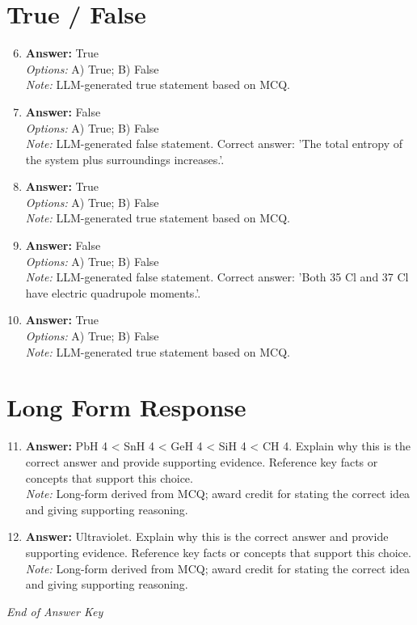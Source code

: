 \documentclass[12pt]{article}
\begin{document}
\section*{True / False}
\begin{enumerate}[label=\arabic*.]
\setcounter{enumi}{5}
\item \textbf{Answer:} True
\\ \textit{Options:} A) True; B) False
\\ \textit{Note:} LLM-generated true statement based on MCQ.
\item \textbf{Answer:} False
\\ \textit{Options:} A) True; B) False
\\ \textit{Note:} LLM-generated false statement. Correct answer: 'The total entropy of the system plus surroundings increases.'.
\item \textbf{Answer:} True
\\ \textit{Options:} A) True; B) False
\\ \textit{Note:} LLM-generated true statement based on MCQ.
\item \textbf{Answer:} False
\\ \textit{Options:} A) True; B) False
\\ \textit{Note:} LLM-generated false statement. Correct answer: 'Both 35 Cl and 37 Cl have electric quadrupole moments.'.
\item \textbf{Answer:} True
\\ \textit{Options:} A) True; B) False
\\ \textit{Note:} LLM-generated true statement based on MCQ.
\end{enumerate}

\section*{Long Form Response}
\begin{enumerate}[label=\arabic*.]
\setcounter{enumi}{10}
\item \textbf{Answer:} PbH 4 \textless{} SnH 4 \textless{} GeH 4 \textless{} SiH 4 \textless{} CH 4. Explain why this is the correct answer and provide supporting evidence. Reference key facts or concepts that support this choice.
\\ \textit{Note:} Long-form derived from MCQ; award credit for stating the correct idea and giving supporting reasoning.
\item \textbf{Answer:} Ultraviolet. Explain why this is the correct answer and provide supporting evidence. Reference key facts or concepts that support this choice.
\\ \textit{Note:} Long-form derived from MCQ; award credit for stating the correct idea and giving supporting reasoning.
\end{enumerate}

\vfill
\noindent\textit{End of Answer Key}
\end{document}
